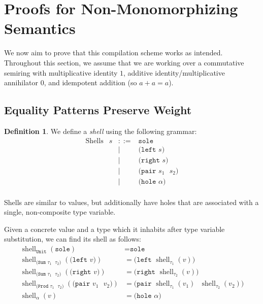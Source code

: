 \documentclass{report}
\theoremstyle{definition}
\newtheorem{definition}{Definition}
\DeclareMathOperator{\shell}{shell}
\begin{document}
\section{Proofs for Non-Monomorphizing Semantics}

We now aim to prove that this compilation scheme works as intended.
Throughout this section, we assume that we are working over a commutative semiring with multiplicative identity \(1\), additive identity/multiplicative annihilator \(0\),
and idempotent addition (so \(a + a = a\)).

\subsection{Equality Patterns Preserve Weight}

\begin{definition}
	We define a \emph{shell} using the following grammar:
	\[ \begin{array}{lrcl}
		\textrm{Shells} & s & ::= & \texttt{sole} \\
		& & | & \texttt{(left \(s\))} \\
		& & | & \texttt{(right \(s\))} \\
		& & | & \texttt{(pair \(s_1\) \(s_2\))} \\
		& & | & \texttt{(hole \(\alpha\))} \\
	\end{array} \]
\end{definition}

Shells are similar to values, but additionally have holes that are associated with a single, non-composite type variable.

Given a concrete value and a type which it inhabits after type variable substitution, we can find its shell as follows:
\begin{equation}
\begin{aligned}
	\shell_\texttt{Unit}(\texttt{sole}) &= \texttt{sole} \\
	\shell_\texttt{(Sum \(\tau_1\) \(\tau_2\))}(\texttt{(left \(v\))}) &= \texttt{(left \(\shell_{\tau_1}(v)\))} \\
	\shell_\texttt{(Sum \(\tau_1\) \(\tau_2\))}(\texttt{(right \(v\))}) &= \texttt{(right \(\shell_{\tau_2}(v)\))} \\
	\shell_\texttt{(Prod \(\tau_1\) \(\tau_2\))}(\texttt{(pair \(v_1\) \(v_2\))}) &= \texttt{(pair \(\shell_{\tau_1}(v_1)\) \(\shell_{\tau_2}(v_2)\))} \\
	\shell_\alpha(v) &= \texttt{(hole \(\alpha\))}
\end{aligned}
\end{equation}
\end{document}
